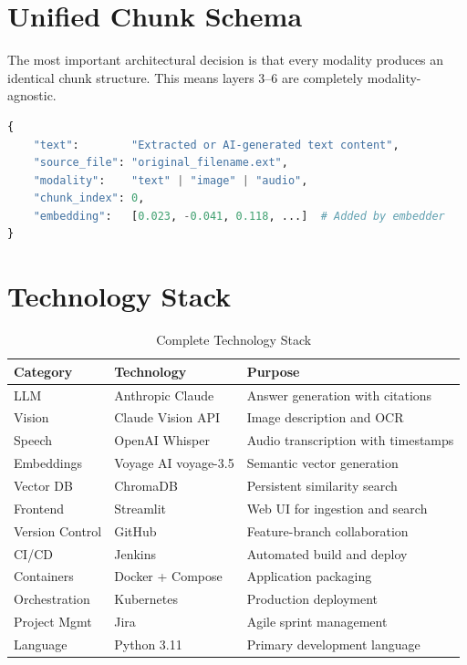 \documentclass[12pt,a4paper]{report}
\begin{document}
\section{Unified Chunk Schema}

The most important architectural decision is that every modality produces an identical chunk structure. This means layers 3--6 are completely modality-agnostic.

\begin{lstlisting}[language=Python, caption=Unified Chunk Schema Shared Across All Modalities]
{
    "text":        "Extracted or AI-generated text content",
    "source_file": "original_filename.ext",
    "modality":    "text" | "image" | "audio",
    "chunk_index": 0,
    "embedding":   [0.023, -0.041, 0.118, ...]  # Added by embedder
}
\end{lstlisting}

\section{Technology Stack}

\begin{table}[H]
\centering
\caption{Complete Technology Stack}
\begin{tabular}{p{3cm}p{3.5cm}p{6.5cm}}
\toprule
\textbf{Category} & \textbf{Technology} & \textbf{Purpose} \\
\midrule
LLM & Anthropic Claude & Answer generation with citations \\
Vision & Claude Vision API & Image description and OCR \\
Speech & OpenAI Whisper & Audio transcription with timestamps \\
Embeddings & Voyage AI voyage-3.5 & Semantic vector generation \\
Vector DB & ChromaDB & Persistent similarity search \\
Frontend & Streamlit & Web UI for ingestion and search \\
Version Control & GitHub & Feature-branch collaboration \\
CI/CD & Jenkins & Automated build and deploy \\
Containers & Docker + Compose & Application packaging \\
Orchestration & Kubernetes & Production deployment \\
Project Mgmt & Jira & Agile sprint management \\
Language & Python 3.11 & Primary development language \\
\bottomrule
\end{tabular}
\end{table}
\end{document}
